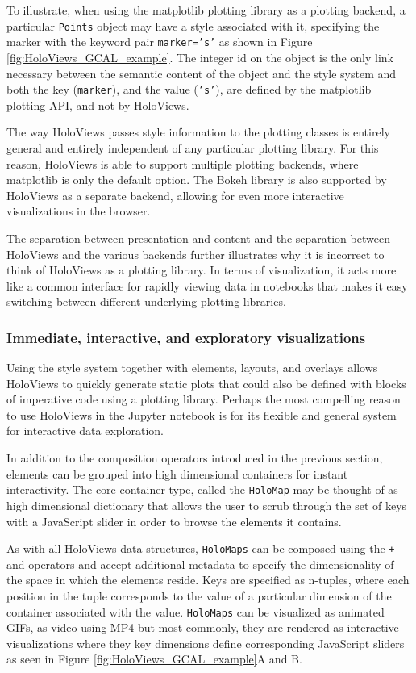 \documentclass[phd,ianc,twoside]{infthesis}
\begin{document}
To illustrate, when using the matplotlib plotting library
\citep{hunter_ieee07} as a plotting backend, a particular {\tt Points}
object may have a style associated with it, specifying the marker with
the keyword pair {\tt marker='s'} as shown in Figure
\ref{fig:HoloViews_GCAL_example}. The integer id on the object is the
only link necessary between the semantic content of the object and the
style system and both the key ({\tt marker}), and the value ({\tt 's'}),
are defined by the matplotlib plotting API, and not by HoloViews.

The way HoloViews passes style information to the plotting classes is
entirely general and entirely independent of any particular plotting
library. For this reason, HoloViews is able to support multiple plotting
backends, where matplotlib is only the default option. The Bokeh library
\citep{bokeh_manual} is also supported by HoloViews as a separate
backend, allowing for even more interactive visualizations in the
browser.

The separation between presentation and content and the separation
between HoloViews and the various backends further illustrates why it is
incorrect to think of HoloViews as a plotting library. In terms of
visualization, it acts more like a common interface for rapidly viewing
data in notebooks that makes it easy switching between different
underlying plotting libraries.


\subsubsection*{Immediate, interactive, and exploratory visualizations}

Using the style system together with elements, layouts, and overlays
allows HoloViews to quickly generate static plots that could also be
defined with blocks of imperative code using a plotting library. Perhaps
the most compelling reason to use HoloViews in the Jupyter notebook is
for its flexible and general system for interactive data exploration.

In addition to the composition operators introduced in the previous
section, elements can be grouped into high dimensional containers for
instant interactivity. The core container type, called the {\tt HoloMap}
may be thought of as high dimensional dictionary that allows the user to
scrub through the set of keys with a JavaScript slider in order to
browse the elements it contains.

As with all HoloViews data structures, {\tt HoloMaps} can be composed
using the {\tt +} and {\tt *} operators and accept additional metadata
to specify the dimensionality of the space in which the elements
reside. Keys are specified as n-tuples, where each position in the tuple
corresponds to the value of a particular dimension of the container
associated with the value. {\tt HoloMaps} can be visualized as animated
GIFs, as video using MP4 but most commonly, they are rendered as
interactive visualizations where they key dimensions define
corresponding JavaScript sliders as seen in Figure
\ref{fig:HoloViews_GCAL_example}A and B.
\end{document}
